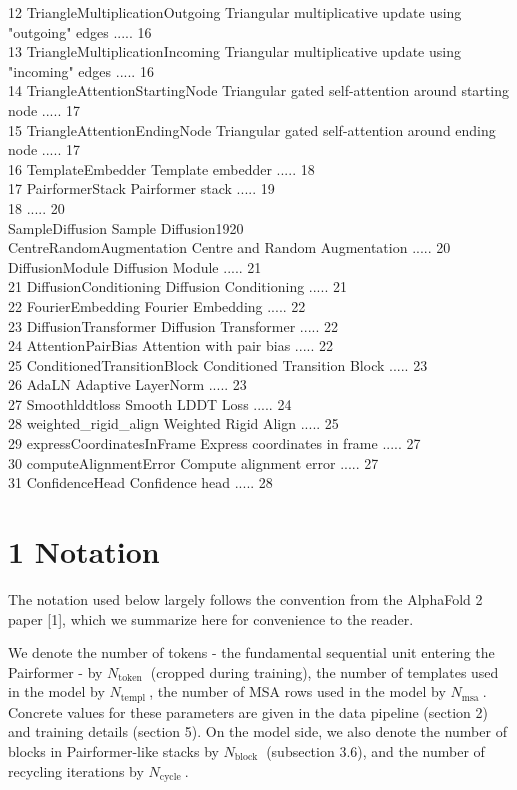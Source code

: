 \documentclass[10pt]{article}
\begin{document}
12 TriangleMultiplicationOutgoing Triangular multiplicative update using "outgoing" edges ..... 16\\
13 TriangleMultiplicationIncoming Triangular multiplicative update using "incoming" edges ..... 16\\
14 TriangleAttentionStartingNode Triangular gated self-attention around starting node ..... 17\\
15 TriangleAttentionEndingNode Triangular gated self-attention around ending node ..... 17\\
16 TemplateEmbedder Template embedder ..... 18\\
17 PairformerStack Pairformer stack ..... 19\\
18 ..... 20\\
SampleDiffusion Sample Diffusion1920\\
CentreRandomAugmentation Centre and Random Augmentation ..... 20\\
DiffusionModule Diffusion Module ..... 21\\
21 DiffusionConditioning Diffusion Conditioning ..... 21\\
22 FourierEmbedding Fourier Embedding ..... 22\\
23 DiffusionTransformer Diffusion Transformer ..... 22\\
24 AttentionPairBias Attention with pair bias ..... 22\\
25 ConditionedTransitionBlock Conditioned Transition Block ..... 23\\
26 AdaLN Adaptive LayerNorm ..... 23\\
27 Smoothlddtloss Smooth LDDT Loss ..... 24\\
28 weighted\_rigid\_align Weighted Rigid Align ..... 25\\
29 expressCoordinatesInFrame Express coordinates in frame ..... 27\\
30 computeAlignmentError Compute alignment error ..... 27\\
31 ConfidenceHead Confidence head ..... 28

\section*{1 Notation}
The notation used below largely follows the convention from the AlphaFold 2 paper [1], which we summarize here for convenience to the reader.

We denote the number of tokens - the fundamental sequential unit entering the Pairformer - by $N_{\text {token }}$ (cropped during training), the number of templates used in the model by $N_{\text {templ }}$, the number of MSA rows used in the model by $N_{\text {msa }}$. Concrete values for these parameters are given in the data pipeline (section 2) and training details (section 5). On the model side, we also denote the number of blocks in Pairformer-like stacks by $N_{\text {block }}$ (subsection 3.6), and the number of recycling iterations by $N_{\text {cycle }}$.
\end{document}
